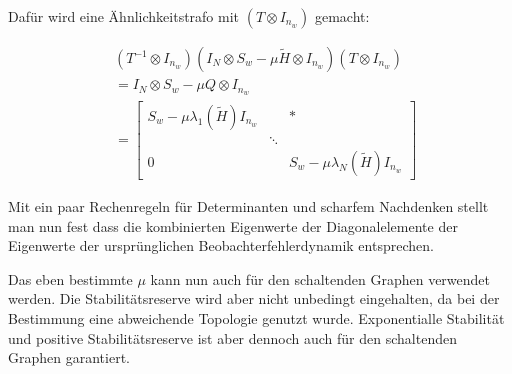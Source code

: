 Dafür wird eine Ähnlichkeitstrafo mit $(T\otimes I_{n_w})$ gemacht:

\begin{align}
    &(T^{-1} \otimes I_{n_w})(I_N \otimes S_w - \mu \tilde{H} \otimes I_{n_w})(T\otimes I_{n_w}) \\
    &= I_N \otimes S_w - \mu Q \otimes I_{n_w} \\
    &= \begin{bmatrix}
        S_w - \mu \lambda_1(\tilde{H}) I_{n_w} & &*\\
        & \ddots & \\
        0 & & S_w - \mu \lambda_N(\tilde{H}) I_{n_w}
    \end{bmatrix}
\end{align}

Mit ein paar Rechenregeln für Determinanten und scharfem Nachdenken stellt man
nun fest dass die kombinierten Eigenwerte der Diagonalelemente der Eigenwerte
der ursprünglichen Beobachterfehlerdynamik entsprechen.

Das eben bestimmte $\mu$ kann nun auch für den schaltenden Graphen verwendet
werden. Die Stabilitätsreserve wird aber nicht unbedingt eingehalten, da bei der
Bestimmung eine abweichende Topologie genutzt wurde.
Exponentialle Stabilität und positive Stabilitätsreserve ist aber dennoch auch
für den schaltenden Graphen garantiert.

